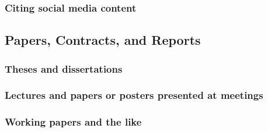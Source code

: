 \documentclass[11pt,letterpaper,oneside]{article}
\begin{document}
\subsubsection{Citing social media content}

\begin{citebib}
\item \cite{diaz2016}
\item \cite{obrien2015}
\item \cite{chicago2015}
\item \cite{licis2016}
\end{citebib}

\setcounter{subsection}{7}
\subsection{Papers, Contracts, and Reports}
\setcounter{subsection}{14}

\setcounter{subsubsection}{214}
\subsubsection{Theses and dissertations}

\begin{citebib}
\item \cite[59]{vedrashko2006}
\item \cite{choi2008}
\end{citebib}

\setcounter{subsubsection}{216}
\subsubsection{Lectures and papers or posters presented at meetings}

\begin{citebib}
\item \cite{hong2015}
\end{citebib}

\subsubsection{Working papers and the like}

\begin{citebib}
\item \cite{lucki1980}
\end{citebib}
\end{document}
